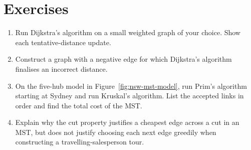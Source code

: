 \section*{Exercises}
\begin{enumerate}
\item Run Dijkstra's algorithm on a small weighted graph of your choice. Show each tentative-distance update.
\item Construct a graph with a negative edge for which Dijkstra's algorithm finalises an incorrect distance.
\item On the five-hub model in Figure~\ref{fig:nsw-mst-model}, run Prim's algorithm starting at Sydney and run Kruskal's algorithm. List the accepted links in order and find the total cost of the MST.
\item Explain why the cut property justifies a cheapest edge across a cut in an MST, but does not justify choosing each next edge greedily when constructing a travelling-salesperson tour.
\end{enumerate}
